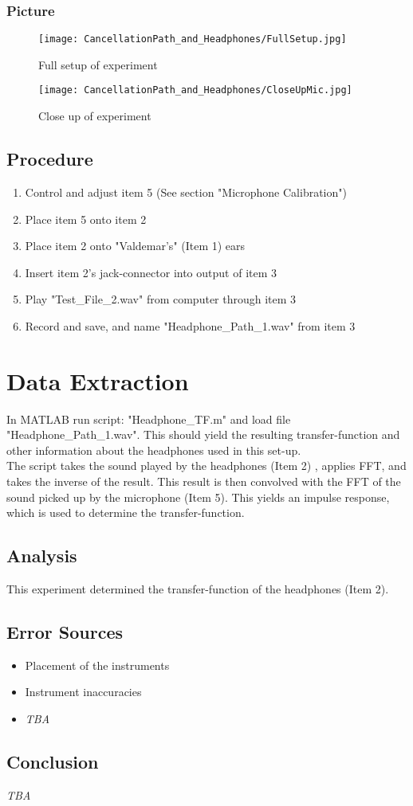 \subsubsection{Picture}
\begin{figure}[H]
	\centering
	\texttt{[image: CancellationPath\_and\_Headphones/FullSetup.jpg]}
	\caption{Full setup of experiment}
	\label{FullSetupCancellationPath}
\end{figure}

\begin{figure}[H]
	\centering
	\texttt{[image: CancellationPath\_and\_Headphones/CloseUpMic.jpg]}
	\caption{Close up of experiment}
	\label{CloseUpCancellationPath}
\end{figure}

\subsection{Procedure}
\begin{enumerate}
	\item Control and adjust item 5 (See section "Microphone Calibration")
	\item Place item 5 onto item 2
	\item Place item 2 onto "Valdemar's" (Item 1) ears
	\item Insert item 2's jack-connector into output of item 3
	\item Play "Test\_File\_2.wav" from computer through item 3
	\item Record and save, and name "Headphone\_Path\_1.wav" from item 3
\end{enumerate}

\section{Data Extraction}
In MATLAB\textsuperscript{\textregistered} run script: "Headphone\_TF.m" and load file "Headphone\_Path\_1.wav". This should yield the resulting transfer-function and other information about the headphones used in this set-up.\\
\indent The script takes the sound played by the headphones (Item 2) , applies FFT, and takes the inverse of the result. This result is then convolved with the FFT of the sound picked up by the microphone (Item 5). This yields an impulse response, which is used to determine the transfer-function.

\subsection{Analysis}
This experiment determined the transfer-function of the headphones (Item 2).

\subsection{Error Sources}
\begin{itemize}
	\item Placement of the instruments
	\item Instrument inaccuracies 
	\item \textit{TBA}
\end{itemize}

\subsection{Conclusion}
\textit{TBA}
